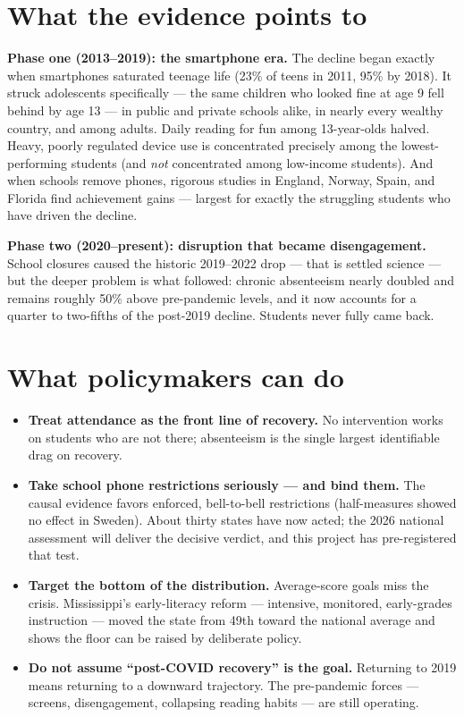 \documentclass[10pt]{article}
\begin{document}
\section{What the evidence points to}
\textbf{Phase one (2013--2019): the smartphone era.} The decline began exactly when smartphones saturated teenage life (23\% of teens in 2011, 95\% by 2018). It struck adolescents specifically --- the same children who looked fine at age 9 fell behind by age 13 --- in public and private schools alike, in nearly every wealthy country, and among adults. Daily reading for fun among 13-year-olds halved. Heavy, poorly regulated device use is concentrated precisely among the lowest-performing students (and \emph{not} concentrated among low-income students). And when schools remove phones, rigorous studies in England, Norway, Spain, and Florida find achievement gains --- largest for exactly the struggling students who have driven the decline.

\textbf{Phase two (2020--present): disruption that became disengagement.} School closures caused the historic 2019--2022 drop --- that is settled science --- but the deeper problem is what followed: chronic absenteeism nearly doubled and remains roughly 50\% above pre-pandemic levels, and it now accounts for a quarter to two-fifths of the post-2019 decline. Students never fully came back.

\section{What policymakers can do}
\begin{itemize}
\item \textbf{Treat attendance as the front line of recovery.} No intervention works on students who are not there; absenteeism is the single largest identifiable drag on recovery.
\item \textbf{Take school phone restrictions seriously --- and bind them.} The causal evidence favors enforced, bell-to-bell restrictions (half-measures showed no effect in Sweden). About thirty states have now acted; the 2026 national assessment will deliver the decisive verdict, and this project has pre-registered that test.
\item \textbf{Target the bottom of the distribution.} Average-score goals miss the crisis. Mississippi's early-literacy reform --- intensive, monitored, early-grades instruction --- moved the state from 49th toward the national average and shows the floor can be raised by deliberate policy.
\item \textbf{Do not assume ``post-COVID recovery'' is the goal.} Returning to 2019 means returning to a downward trajectory. The pre-pandemic forces --- screens, disengagement, collapsing reading habits --- are still operating.
\end{itemize}
\end{document}
